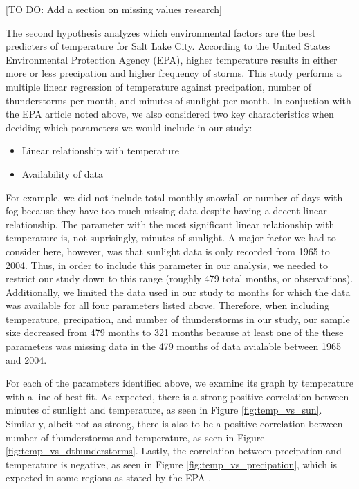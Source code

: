 [TO DO: Add a section on missing values research]

The second hypothesis analyzes which environmental factors are the best predicters of temperature for Salt Lake City. According to the United States Environmental Protection Agency (EPA), higher temperature results in either more or less precipation and higher frequency of storms\cite{epa_utah}. This study performs a multiple linear regression of temperature against precipation, number of thunderstorms per month, and minutes of sunlight per month. In conjuction with the EPA article noted above, we also considered two key characteristics when deciding which parameters we would include in our study: 

\begin{itemize}
	\item Linear relationship with temperature
	\item Availability of data
\end{itemize}

For example, we did not include total monthly snowfall or number of days with fog because they have too much missing data despite having a decent linear relationship. The parameter with the most significant linear relationship with temperature is, not suprisingly, minutes of sunlight. A major factor we had to consider here, however, was that sunlight data is only recorded from 1965 to 2004. Thus, in order to include this parameter in our analysis, we needed to restrict our study down to this range (roughly 479 total months, or observations). Additionally, we limited the data used in our study to months for which the data was available for all four parameters listed above. Therefore, when including temperature, precipation, and number of thunderstorms in our study, our sample size decreased from 479 months to 321 months because at least one of the these parameters was missing data in the 479 months of data avialable between 1965 and 2004.

For each of the parameters identified above, we examine its graph by temperature with a line of best fit. As expected, there is a strong positive correlation between minutes of sunlight and temperature, as seen in Figure \ref{fig:temp_vs_sun}. Similarly, albeit not as strong, there is also to be a positive correlation between number of thunderstorms and temperature, as seen in Figure \ref{fig:temp_vs_dthunderstorms}. Lastly, the correlation between precipation and temperature is negative, as seen in Figure \ref{fig:temp_vs_precipation}, which is expected in some regions as stated by the EPA \cite{epa_utah}.

